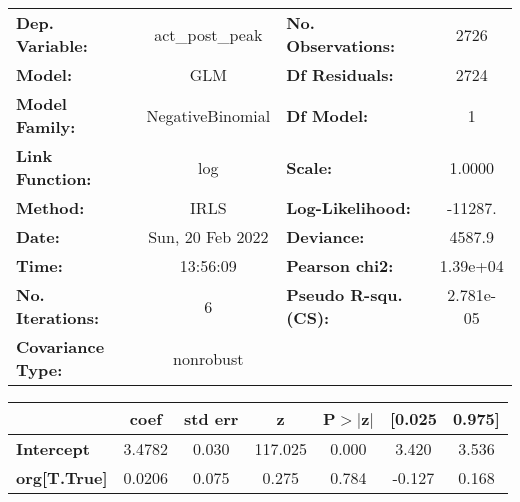 \begin{center}
\begin{tabular}{lclc}
\toprule
\textbf{Dep. Variable:}   & act\_post\_peak  & \textbf{  No. Observations:  } &     2726    \\
\textbf{Model:}           &       GLM        & \textbf{  Df Residuals:      } &     2724    \\
\textbf{Model Family:}    & NegativeBinomial & \textbf{  Df Model:          } &        1    \\
\textbf{Link Function:}   &       log        & \textbf{  Scale:             } &    1.0000   \\
\textbf{Method:}          &       IRLS       & \textbf{  Log-Likelihood:    } &   -11287.   \\
\textbf{Date:}            & Sun, 20 Feb 2022 & \textbf{  Deviance:          } &    4587.9   \\
\textbf{Time:}            &     13:56:09     & \textbf{  Pearson chi2:      } &  1.39e+04   \\
\textbf{No. Iterations:}  &        6         & \textbf{  Pseudo R-squ. (CS):} & 2.781e-05   \\
\textbf{Covariance Type:} &    nonrobust     & \textbf{                     } &             \\
\bottomrule
\end{tabular}
\begin{tabular}{lcccccc}
                     & \textbf{coef} & \textbf{std err} & \textbf{z} & \textbf{P$> |$z$|$} & \textbf{[0.025} & \textbf{0.975]}  \\
\midrule
\textbf{Intercept}   &       3.4782  &        0.030     &   117.025  &         0.000        &        3.420    &        3.536     \\
\textbf{org[T.True]} &       0.0206  &        0.075     &     0.275  &         0.784        &       -0.127    &        0.168     \\
\bottomrule
\end{tabular}
\end{center}